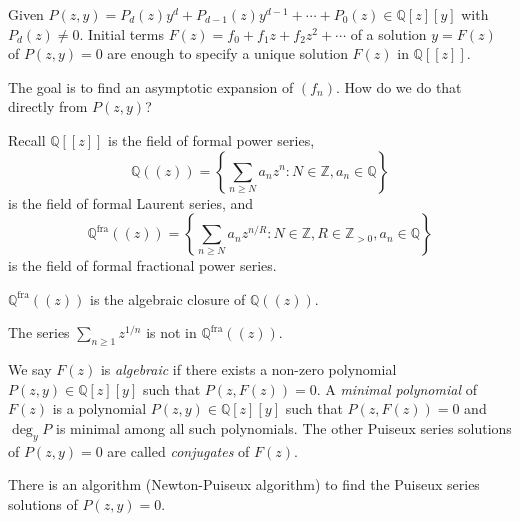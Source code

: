 
Given \(P(z, y) = P_d(z) y^d + P_{d-1}(z) y^{d-1} + \cdots + P_0(z) \in \mathbb{Q}[z][y]\) with \(P_d(z) \neq 0\).
Initial terms \(F(z) = f_0 + f_1 z + f_2 z^2 + \cdots\) of a solution \(y = F(z)\) of \(P(z, y) = 0\) are enough to specify a unique solution \(F(z)\) in \(\mathbb{Q}[[z]]\).

The goal is to find an asymptotic expansion of \((f_n)\).
How do we do that directly from \(P(z, y)\)?

Recall \(\mathbb{Q}[[z]]\) is the field of formal power series,
\[
    \mathbb{Q}((z)) = \left\{ \sum_{n \geq N} a_n z^n : N \in \mathbb{Z}, a_n \in \mathbb{Q} \right\}
\]
is the field of formal Laurent series, and
\[
    \mathbb{Q}^{\mathrm{fra}}((z)) = \left\{ \sum_{n \geq N} a_n z^{n/R} : N \in \mathbb{Z}, R \in \mathbb{Z}_{>0}, a_n \in \mathbb{Q} \right\}
\]
is the field of formal fractional power series.

\begin{theorem}
    \(\mathbb{Q}^{\mathrm{fra}}((z))\) is the algebraic closure of \(\mathbb{Q}((z))\).
\end{theorem}

\begin{example}
    The series \(\sum_{n \geq 1} z^{1/n}\) is not in \(\mathbb{Q}^{\mathrm{fra}}((z))\).
\end{example}

We say \(F(z)\) is \emph{algebraic} if there exists a non-zero polynomial \(P(z, y) \in \mathbb{Q}[z][y]\) such that \(P(z, F(z)) = 0\).
A \emph{minimal polynomial} of \(F(z)\) is a polynomial \(P(z, y) \in \mathbb{Q}[z][y]\) such that \(P(z, F(z)) = 0\) and \(\deg_y P\) is minimal among all such polynomials.
The other Puiseux series solutions of \(P(z, y) = 0\) are called \emph{conjugates} of \(F(z)\).

There is an algorithm (Newton-Puiseux algorithm) to find the Puiseux series solutions of \(P(z, y) = 0\).

